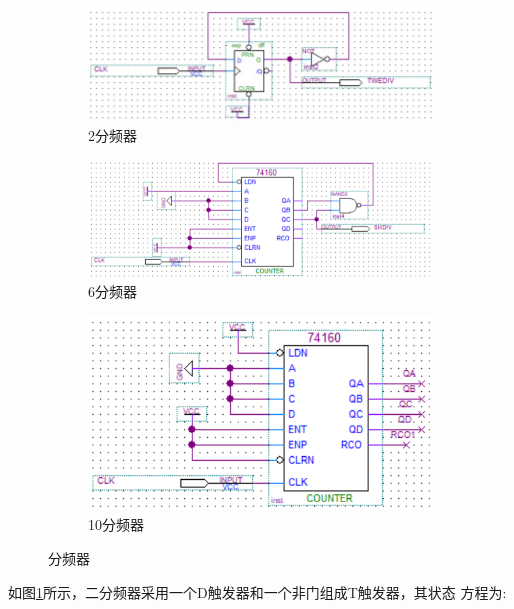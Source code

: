 \documentclass[twoside, openright]{article}
\begin{document}
\begin{figure}[htbp]
	\centering
	\begin{subfigure}[htbp]{.45\linewidth}
		\centering
		\includegraphics[width=\linewidth]{2.jpg}
		\caption{2分频器}
		\label{fig:2分频器}
	\end{subfigure}
	\quad
	\begin{subfigure}[htbp]{.45\linewidth}
		\centering
		\includegraphics[width = \linewidth]{6.png}
		\caption{6分频器}
		\label{fig:6分频器}
	\end{subfigure}
	\quad
	\begin{subfigure}[htbp]{.45\linewidth}
		\centering
		\includegraphics[width = \linewidth]{10.png}
		\caption{10分频器}
		\label{fig:10分频器}
	\end{subfigure}
	\caption{分频器}
	\label{fig:分频器}
\end{figure}

如图\ref{fig:2分频器}所示，二分频器采用一个D触发器和一个非门组成T触发器，其状态
方程为:
\end{document}
